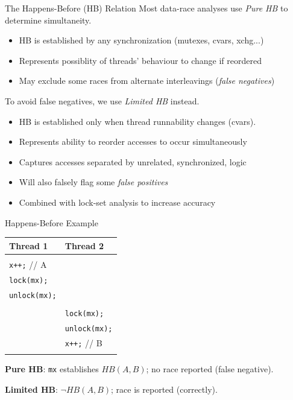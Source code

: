 \documentclass[xcolor=dvipsnames]{beamer}
\begin{document}
\begin{frame}{The Happens-Before (HB) Relation}
	Most data-race analyses use {\em Pure HB} to determine simultaneity.
	\begin{itemize}
		\item HB is established by any synchronization (mutexes, cvars, xchg...)
		\item Represents possiblity of threads' behaviour to change if reordered
		\item May exclude some races from alternate interleavings ({\em false negatives})
	\end{itemize}
	\pause
	\linegap

	To avoid false negatives, we use {\em Limited HB} instead.
	\begin{itemize}
		\item HB is established only when thread runnability changes (cvars).
		\item Represents ability to reorder accesses to occur simultaneously
		\item Captures accesses separated by unrelated, synchronized, logic
		\item Will also falsely flag some {\em false positives}
		\item Combined with lock-set analysis to increase accuracy
	\end{itemize}
\end{frame}


\begin{frame}{Happens-Before Example}
	\begin{center}
		\begin{tabular}{|l|l|}
			\hline
			\cellcolor{thread1} {\bf Thread 1} & \cellcolor{thread2} {\bf Thread 2} \\
			\hline
			& \\
			\small \texttt{x++;} // A & \\
			\small \texttt{lock(mx);} & \\
			\small \texttt{unlock(mx);} & \\
			
			& \\
			& \small \texttt{lock(mx);} \\
			& \small \texttt{unlock(mx);} \\
			& \small \texttt{x++;} // B \\
			& \\
			\hline
		\end{tabular}
	\end{center}
	{\bf Pure HB}: \texttt{mx} establishes $HB(A, B)$; no race reported (false negative).
	\linegap

	{\bf Limited HB}: $\neg HB(A, B)$; race is reported (correctly).
\end{frame}
\end{document}

